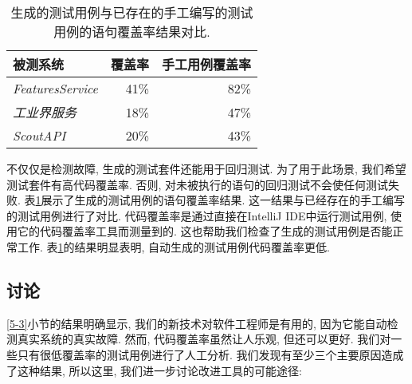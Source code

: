     \begin{table}
      \small
        \centering
        \begin{tabular}{lrr}
          \toprule
            被测系统 & 覆盖率 & 手工用例覆盖率 \\
            \midrule
            \textit{FeaturesService} & 41\% & 82\% \\
            \textit{工业界服务} & 18\% & 47\% \\
            \textit{ScoutAPI} & 20\% & 43\% \\
            \bottomrule
        \end{tabular}
        \caption{生成的测试用例与已存在的手工编写的测试用例的语句覆盖率结果对比. }
        \label{table3}
    \end{table}
        
        不仅仅是检测故障, 生成的测试套件还能用于回归测试. 为了用于此场景, 我们希望测试套件有高代码覆盖率. 否则, 对未被执行的语句的回归测试不会使任何测试失败. 表\ref{table3}展示了生成的测试用例的语句覆盖率结果. 这一结果与已经存在的手工编写的测试用例进行了对比. 代码覆盖率是通过直接在IntelliJ IDE中运行测试用例, 使用它的代码覆盖率工具而测量到的. 这也帮助我们检查了生成的测试用例是否能正常工作. 表\ref{table3}的结果明显表明, 自动生成的测试用例代码覆盖率更低. 
        
    
    \subsection{讨论}
      \ref{5-3}小节的结果明确显示, 我们的新技术对软件工程师是有用的, 因为它能自动检测真实系统的真实故障. 然而, 代码覆盖率虽然让人乐观, 但还可以更好. 我们对一些只有很低覆盖率的测试用例进行了人工分析. 我们发现有至少三个主要原因造成了这种结果, 所以这里, 我们进一步讨论改进工具的可能途径: 
        
